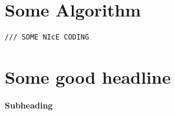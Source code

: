 

\cleartoleftpage
\appendix 

\newpage
\chapter{Some Algorithm}
\label{appendix1}
\lipsum[1]
\begin{lstlisting}
/// SOME NIcE CODING
\end{lstlisting}  
\newpage
\chapter{Some good headline}
\label{appendix2}
\label{intro}
\begin{center}\textbf{{\Large Subheading}}\end{center}
{\small 
	\lipsum[1-2]
} 

\cleartoleftpage
\postappendix

